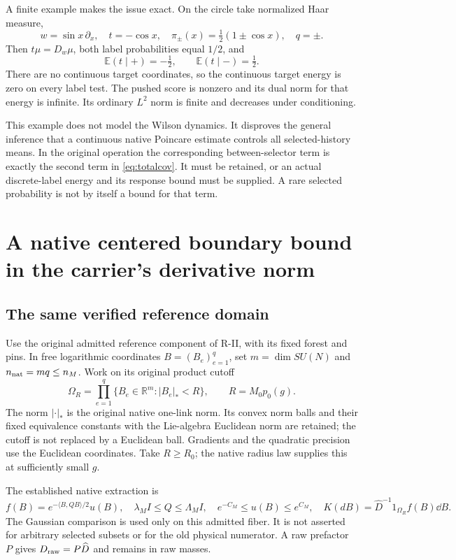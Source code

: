 \documentclass[11pt,letterpaper]{article}
\theoremstyle{remark}\newtheorem{remark}[theorem]{Remark}
\newcommand{\E}{\mathbb E}
\newcommand{\R}{\mathbb R}\newcommand{\C}{\mathbb C}
\begin{document}
A finite example makes the issue exact. On the circle take normalized Haar measure,
\[
 w=\sin x\,\partial_x,\quad t=-\cos x,\quad
 \pi_\pm(x)=\tfrac12(1\pm\cos x),\quad q=\pm.
\]
Then $t\mu=D_w\mu$, both label probabilities equal $1/2$, and
\[
 \E(t\mid +)=-\tfrac12,\qquad \E(t\mid -)=\tfrac12.
\]
There are no continuous target coordinates, so the continuous target energy is zero on every label test. The pushed score is nonzero and its dual norm for that energy is infinite. Its ordinary $L^2$ norm is finite and decreases under conditioning.

This example does not model the Wilson dynamics. It disproves the general inference that a continuous native Poincare estimate controls all selected-history means. In the original operation the corresponding between-selector term is exactly the second term in \eqref{eq:totalcov}. It must be retained, or an actual discrete-label energy and its response bound must be supplied. A rare selected probability is not by itself a bound for that term.

\section{A native centered boundary bound in the carrier's derivative norm}

\subsection{The same verified reference domain}

Use the original admitted reference component of R-II, with its fixed forest and pins. In free logarithmic coordinates $B=(B_e)_{e=1}^q$, set $m=\dim SU(N)$ and $n_{\rm nat}=mq\le n_M$. Work on its original product cutoff
\[
 \Omega_R=\prod_{e=1}^q\{B_e\in\R^m:|B_e|_*<R\},
 \qquad R=M_0p_0(g).
\]
The norm $|\cdot|_*$ is the original native one-link norm. Its convex norm balls and their fixed equivalence constants with the Lie-algebra Euclidean norm are retained; the cutoff is not replaced by a Euclidean ball. Gradients and the quadratic precision use the Euclidean coordinates. Take $R\ge R_0$; the native radius law supplies this at sufficiently small $g$.

The established native extraction is
\begin{equation}\label{eq:native}
 f(B)=e^{-\langle B,QB\rangle/2}u(B),\quad
 \lambda_MI\le Q\le\Lambda_MI,\quad
 e^{-C_M}\le u(B)\le e^{C_M},\quad
 K(dB)=\widehat D^{-1}1_{\Omega_R}f(B)\dd B.
\end{equation}
The Gaussian comparison is used only on this admitted fiber. It is not asserted for arbitrary selected subsets or for the old physical numerator. A raw prefactor $P$ gives $D_{\rm raw}=P\widehat D$ and remains in raw masses.
\end{document}
